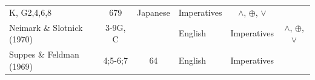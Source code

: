 \documentclass[oneside]{report}
\theoremstyle{definition}
\theoremstyle{definition}
\theoremstyle{definition}
\theoremstyle{remark}
\begin{document}
\begin{longtable}[]{@{}lcclcc@{}}
\begin{minipage}[t]{0.09\columnwidth}
K, G2,4,6,8\strut
\end{minipage} & \begin{minipage}[t]{0.09\columnwidth}\centering\strut
679\strut
\end{minipage} & \begin{minipage}[t]{0.06\columnwidth}\raggedright\strut
Japanese\strut
\end{minipage} & \begin{minipage}[t]{0.31\columnwidth}\centering\strut
Imperatives\strut
\end{minipage} & \begin{minipage}[t]{0.12\columnwidth}\centering\strut
\(\land\), \(\oplus\), \(\lor\)\strut
\end{minipage}\tabularnewline
\begin{minipage}[t]{0.17\columnwidth}\raggedright\strut
Neimark \& Slotnick (1970)\strut
\end{minipage} & \begin{minipage}[t]{0.09\columnwidth}\centering\strut
3-9G, C\strut
\end{minipage} & \begin{minipage}[t]{0.09\columnwidth}\centering\strut
\strut
\end{minipage} & \begin{minipage}[t]{0.06\columnwidth}\raggedright\strut
English\strut
\end{minipage} & \begin{minipage}[t]{0.31\columnwidth}\centering\strut
Imperatives\strut
\end{minipage} & \begin{minipage}[t]{0.12\columnwidth}\centering\strut
\(\land\), \(\oplus\), \(\lor\)\strut
\end{minipage}\tabularnewline
\begin{minipage}[t]{0.17\columnwidth}\raggedright\strut
Suppes \& Feldman (1969)\strut
\end{minipage} & \begin{minipage}[t]{0.09\columnwidth}\centering\strut
4;5-6;7\strut
\end{minipage} & \begin{minipage}[t]{0.09\columnwidth}\centering\strut
64\strut
\end{minipage} & \begin{minipage}[t]{0.06\columnwidth}\raggedright\strut
English\strut
\end{minipage} & \begin{minipage}[t]{0.31\columnwidth}\centering\strut
Imperatives\strut

\end{minipage}
\end{longtable}
\end{document}
